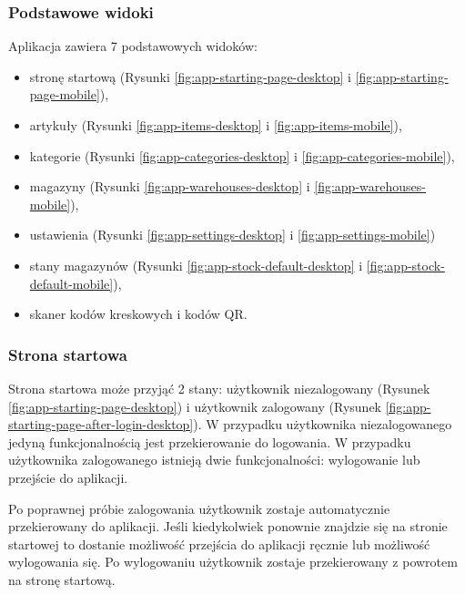 \documentclass[../main.tex]{subfiles}
\begin{document}
        \subsubsection{Podstawowe widoki}
            Aplikacja zawiera 7 podstawowych widoków:
            \begin{itemize}
                \item stronę startową (Rysunki \ref{fig:app-starting-page-desktop} i \ref{fig:app-starting-page-mobile}),
                \item artykuły (Rysunki \ref{fig:app-items-desktop} i \ref{fig:app-items-mobile}),
                \item kategorie (Rysunki \ref{fig:app-categories-desktop} i \ref{fig:app-categories-mobile}),
                \item magazyny (Rysunki \ref{fig:app-warehouses-desktop} i \ref{fig:app-warehouses-mobile}),
                \item ustawienia (Rysunki \ref{fig:app-settings-desktop} i \ref{fig:app-settings-mobile})
                \item stany magazynów (Rysunki \ref{fig:app-stock-default-desktop} i \ref{fig:app-stock-default-mobile}),
                \item skaner kodów kreskowych i kodów QR. 
            \end{itemize}
        
        \subsubsection{Strona startowa}
            Strona startowa może przyjąć 2 stany: użytkownik niezalogowany (Rysunek \ref{fig:app-starting-page-desktop}) i użytkownik zalogowany (Rysunek \ref{fig:app-starting-page-after-login-desktop}).
            W przypadku użytkownika niezalogowanego jedyną funkcjonalnością jest przekierowanie do logowania.
            W przypadku użytkownika zalogowanego istnieją dwie funkcjonalności: wylogowanie lub przejście do aplikacji.

            Po poprawnej próbie zalogowania użytkownik zostaje automatycznie przekierowany do aplikacji. Jeśli kiedykolwiek ponownie znajdzie się na stronie startowej to dostanie możliwość przejścia do aplikacji ręcznie lub możliwość wylogowania się. Po wylogowaniu użytkownik zostaje przekierowany z powrotem na stronę startową.
\end{document}
